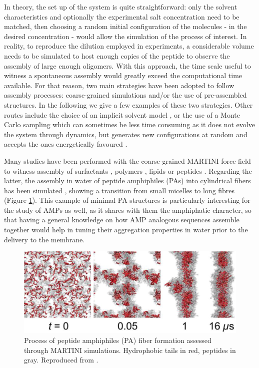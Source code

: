 In theory, the set up of the system is quite straightforward: only the solvent characteristics and optionally the experimental salt concentration need to be matched, then choosing a random initial configuration of the molecules - in the desired concentration - would allow the simulation of the process of interest.
%
In reality, to reproduce the dilution employed in experiments, a considerable volume needs to be simulated to host enough copies of the peptide to observe the assembly of large enough oligomers.
%
With this approach, the time scale useful to witness a spontaneous assembly would greatly exceed the computational time available. For that reason, two main strategies have been adopted to follow assembly processes: coarse-grained simulations and/or  the  use  of pre-assembled structures. In the following we give a few examples of these two strategies. Other routes include the choice of an implicit solvent model \citep{Jusufi2013,Spaeth2011}, or the use of a Monte Carlo sampling which can sometimes be less time consuming as it does not evolve the system through dynamics, but generates new configurations at random and accepts the ones energetically favoured \citep{He2001,Majumdar2019,Luo2015}. 

Many studies have been performed with the coarse-grained MARTINI force field to witness assembly of surfactants \citep{Wu2012}, polymers \citep{Wang2012poly,Bochicchio2017}, lipids \citep{Lee2011,Brocos2012} or peptides \citep{Guo2012,Seo2012}.
%
Regarding the latter, the assembly in water of peptide amphiphiles (PAs) into cylindrical fibers has been simulated \citep{Lee2012}, showing a transition from small micelles to long fibres (Figure \ref{fig:PA}). This example of minimal PA structures is particularly interesting for the study of AMPs as well, as it shares with them the amphiphatic character, so that having a general knowledge on how AMP analogous sequences assemble together would help in tuning their aggregation properties in water prior to the delivery to the membrane.
%
\begin{figure}[t!]
\centering
\includegraphics[width=0.8\linewidth]{2methods/pics/PA.jpeg}
%
\caption[Peptide amphiphiles assembly through MARTINI simulations]{Process of peptide amphiphiles (PA) fiber formation assessed through MARTINI simulations. Hydrophobic tails in red, peptides in gray. Reproduced from \citet{Lee2012}.}
\label{fig:PA}
\end{figure}

